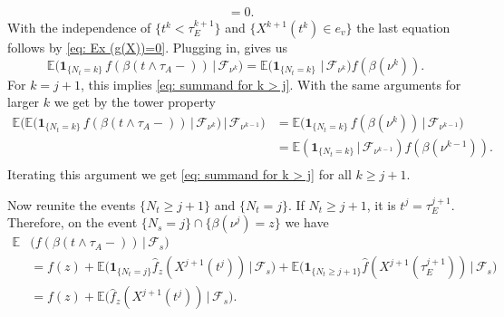 \documentclass[11pt]{article}
\makeatletter
\renewenvironment{proof}[1][\proofname]{
   \par\pushQED{\qed}\normalfont
   \topsep6\p@\@plus6\p@\relax
   \trivlist\item[\hskip\labelsep\bfseries#1\@addpunct{.}]
   \ignorespaces
}{
   \popQED\endtrivlist\@endpefalse
}
\numberwithin{equation}{section}
\def\Ex{\mathbb{E}}
\def\indicator{\boldsymbol{1}}
\makeatother
\begin{document}
\begin{proof}[Proof of Lemma \ref{L:remains to consider the first cross motion}]
\begin{equation}
\begin{split}
    & = 0.
  \end{split}
  \end{equation}
  With the independence of 
  \hbox{$\{ t^k < \tau^{k+1}_E\}$}
  and $\{X^{k+1}(t^k) \in e_v\}$
  the last equation follows by \eqref{eq: Ex (g(X))=0}. 
  Plugging in, gives us 
  \begin{equation}\nonumber
    \Ex \big( \indicator_{\{N_t =k\}} \,
      f(\beta(t \land \tau_A-)) 
      \,\big|\, \mathcal{F}_{\nu^k} \big) 
    = 
    \Ex \big( \indicator_{\{N_t =k\}} \, 
      \,\big|\, \mathcal{F}_{\nu^k} \big)
    f(\beta(\nu^k)).
  \end{equation}
  For $k=j+1$, this implies \eqref{eq: summand for k > j}.
  With the same arguments for larger $k$ we get by the tower property  
  \begin{equation}\nonumber
    \begin{split}
        \Ex \big( 
        \Ex \big( \indicator_{\{N_t =k\}} \,
            f(\beta(t \land \tau_A-)) 
      \,\big|\, \mathcal{F}_{\nu^k} \big) 
      \,\big|\, \mathcal{F}_{\nu^{k-1}} \big) 
    &= 
    \Ex \big( \indicator_{\{N_t =k\}} \, 
    f(\beta(\nu^k)) \,\big|\, \mathcal{F}_{\nu^{k-1}} \big)\\
    &= 
    \Ex ( 
      \indicator_{\{N_t =k\}} 
      \,|\, \mathcal{F}_{\nu^{k-1}} )
    f(\beta(\nu^{k-1})). \\
    \end{split}
  \end{equation}
  Iterating this argument we get \eqref{eq: summand for k > j} for 
  all $k \geq j+1$. 

  Now reunite the events $\{N_t \geq j+1\}$ and $\{N_t = j\}$. 
  If $N_t \geq j+1$, it is $t^j = \tau^{j+1}_E$.
  Therefore, on the event $\{N_s = j\} \cap \{\beta(\nu^j) = z\}$ we have
  \begin{equation}\nonumber
    \begin{split}
      \Ex &\big( 
          f(\beta(t \land \tau_A-)) 
            \,\big|\,  \mathcal{F}_s \big) \\
      &= f(z) + \Ex \big( \indicator_{\{N_t = j\}} 
          \hat{f}_z( X^{j+1}(t^j)) 
            \,\big|\,  \mathcal{F}_s \big)
          + \Ex \big( \indicator_{\{N_t \geq j+1\}}
              \hat{f}(X^{j+1}(\tau^{j+1}_E)) \,\big|\,
            \mathcal{F}_s \big)  \\
      &= f(z) + \Ex \big( 
          \hat{f}_z(X^{j+1}(t^j))  
        \,\big|\,  \mathcal{F}_s \big).
    \end{split}
  \end{equation}
\end{proof}
\end{document}
